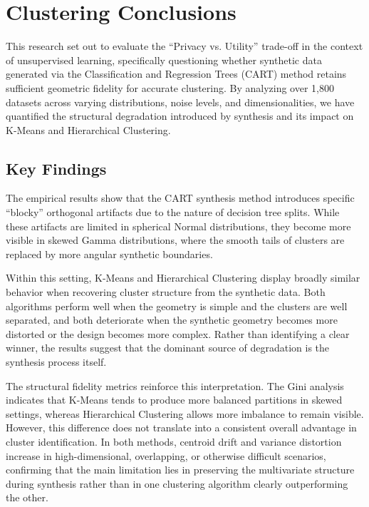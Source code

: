 \chapter{Clustering Conclusions}
\label{chap:conclusions}

This research set out to evaluate the ``Privacy vs. Utility'' trade-off in the context of unsupervised learning, specifically questioning whether synthetic data generated via the Classification and Regression Trees (CART) method retains sufficient geometric fidelity for accurate clustering. By analyzing over 1,800 datasets across varying distributions, noise levels, and dimensionalities, we have quantified the structural degradation introduced by synthesis and its impact on K-Means and Hierarchical Clustering.

\section{Key Findings}
\label{sec:key-findings}

The empirical results show that the CART synthesis method introduces specific ``blocky'' orthogonal artifacts due to the nature of decision tree splits. While these artifacts are limited in spherical Normal distributions, they become more visible in skewed Gamma distributions, where the smooth tails of clusters are replaced by more angular synthetic boundaries.

Within this setting, K-Means and Hierarchical Clustering display broadly similar behavior when recovering cluster structure from the synthetic data. Both algorithms perform well when the geometry is simple and the clusters are well separated, and both deteriorate when the synthetic geometry becomes more distorted or the design becomes more complex. Rather than identifying a clear winner, the results suggest that the dominant source of degradation is the synthesis process itself.

The structural fidelity metrics reinforce this interpretation. The Gini analysis indicates that K-Means tends to produce more balanced partitions in skewed settings, whereas Hierarchical Clustering allows more imbalance to remain visible. However, this difference does not translate into a consistent overall advantage in cluster identification. In both methods, centroid drift and variance distortion increase in high-dimensional, overlapping, or otherwise difficult scenarios, confirming that the main limitation lies in preserving the multivariate structure during synthesis rather than in one clustering algorithm clearly outperforming the other.


